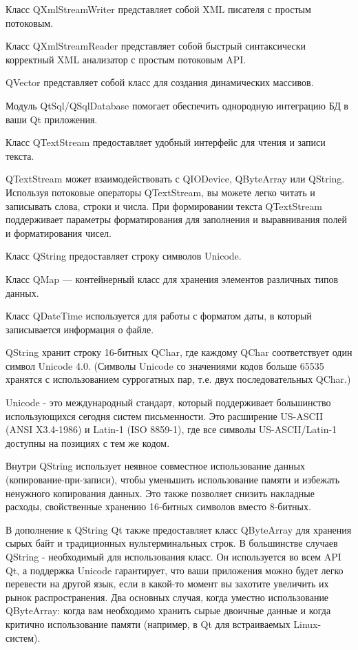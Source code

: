 Класс QXmlStreamWriter представляет собой XML писателя с простым потоковым.

Класс QXmlStreamReader представляет собой быстрый синтаксически корректный XML анализатор с простым потоковым API. 

QVector представляет собой класс для создания динамических массивов.

Модуль QtSql/QSqlDatabase помогает обеспечить однородную интеграцию БД в ваши Qt приложения.

Класс QTextStream предоставляет удобный интерфейс для чтения и записи текста.

QTextStream может взаимодействовать с QIODevice, QByteArray или QString. Используя потоковые операторы QTextStream, вы можете легко читать и записывать слова, строки и числа. При формировании текста QTextStream поддерживает параметры форматирования для заполнения и выравнивания полей и форматирования чисел. \cite{qtdoc}

Класс QString предоставляет строку символов Unicode.

Класс QMap --- контейнерный класс для хранения элементов различных типов данных.

Класс QDateTime используется для работы с форматом даты, в который записывается информация о файле.

QString хранит строку 16-битных QChar, где каждому QChar соответствует один символ Unicode 4.0. (Символы Unicode со значениями кодов больше 65535 хранятся с использованием суррогатных пар, т.е. двух последовательных QChar.)

Unicode - это международный стандарт, который поддерживает большинство использующихся сегодня систем письменности. Это расширение US-ASCII (ANSI X3.4-1986) и Latin-1 (ISO 8859-1), где все символы US-ASCII/Latin-1 доступны на позициях с тем же кодом.

Внутри QString использует неявное совместное использование данных (копирование-при-записи), чтобы уменьшить использование памяти и избежать ненужного копирования данных. Это также позволяет снизить накладные расходы, свойственные хранению 16-битных символов вместо 8-битных.

В дополнение к QString Qt также предоставляет класс QByteArray для хранения сырых байт и традиционных нультерминальных строк. В большинстве случаев QString - необходимый для использования класс. Он используется во всем API Qt, а поддержка Unicode гарантирует, что ваши приложения можно будет легко перевести на другой язык, если в какой-то момент вы захотите увеличить их рынок распространения. Два основных случая, когда уместно использование QByteArray: когда вам необходимо хранить сырые двоичные данные и когда критично использование памяти (например, в Qt для встраиваемых Linux-систем). \cite{qtcross}


